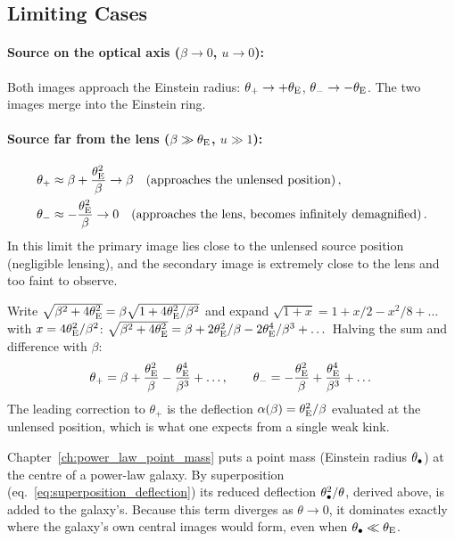 \subsection{Limiting Cases}

\paragraph{Source on the optical axis ($\beta \to 0$, $u \to 0$):}
Both images approach the Einstein radius:
$\theta_+ \to +\theta_{\mathrm{E}}$, $\theta_- \to -\theta_{\mathrm{E}}$.
The two images merge into the Einstein ring.

\paragraph{Source far from the lens ($\beta \gg \theta_{\mathrm{E}}$, $u \gg 1$):}
\begin{align}
    \theta_+ &\approx \beta + \frac{\theta_{\mathrm{E}}^2}{\beta}
    \to \beta \quad \text{(approaches the unlensed position)} \,,
    \label{eq:theta_plus_limit} \\
    \theta_- &\approx -\frac{\theta_{\mathrm{E}}^2}{\beta} \to 0
    \quad \text{(approaches the lens, becomes infinitely demagnified)} \,.
    \label{eq:theta_minus_limit}
\end{align}
In this limit the primary image lies close to the unlensed source
position (negligible lensing), and the secondary image is extremely
close to the lens and too faint to observe.
\begin{derivation}
Write $\sqrt{\beta^2 + 4\theta_{\mathrm{E}}^2} = \beta\sqrt{1 + 4\theta_{\mathrm{E}}^2/\beta^2}$ and
expand $\sqrt{1+x} = 1 + x/2 - x^2/8 + \dots$ with $x = 4\theta_{\mathrm{E}}^2/\beta^2$:
$\sqrt{\beta^2 + 4\theta_{\mathrm{E}}^2} = \beta + 2\theta_{\mathrm{E}}^2/\beta - 2\theta_{\mathrm{E}}^4/\beta^3 + \dots$
Halving the sum and difference with $\beta$:
\begin{equation*}
    \theta_+ = \beta + \frac{\theta_{\mathrm{E}}^2}{\beta} - \frac{\theta_{\mathrm{E}}^4}{\beta^3} + \dots,
    \qquad
    \theta_- = -\frac{\theta_{\mathrm{E}}^2}{\beta} + \frac{\theta_{\mathrm{E}}^4}{\beta^3} + \dots
\end{equation*}
The leading correction to $\theta_+$ is the deflection $\alpha(\beta) = \theta_{\mathrm{E}}^2/\beta$
evaluated at the unlensed position, which is what one expects from a single weak kink.
\end{derivation}
\begin{bridge}
Chapter~\ref{ch:power_law_point_mass} puts a point mass (Einstein radius
$\theta_{\bullet}$) at the centre of a power-law galaxy. By superposition
(eq.~\ref{eq:superposition_deflection}) its reduced deflection
$\theta_{\bullet}^2/\theta$, derived above, is added to the galaxy's.
Because this term diverges as $\theta \to 0$, it dominates exactly where the
galaxy's own central images would form, even when $\theta_{\bullet} \ll \theta_{\mathrm{E}}$.
\end{bridge}

